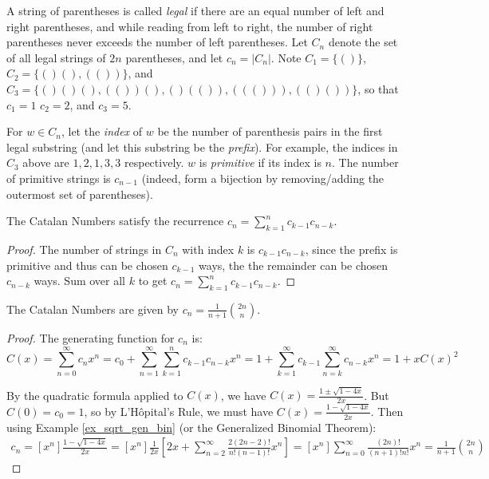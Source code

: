 \documentclass[a4paper]{article}
\begin{document}
\begin{definition}
A string of parentheses is called \emph{legal} if there are an equal number of left and right parentheses, and while reading from left to right, the number of right parentheses never exceeds the number of left parentheses. Let $C_n$ denote the set of all legal strings of $2n$ parentheses, and let $c_n=|C_n|$. Note $C_1=\{()\}$, $C_2=\{()(),(())\}$, and $C_3=\{()()(),(())(),()(()),((())),(()())\}$, so that $c_1=1$ $c_2=2$, and $c_3=5$.

\medskip

For $w\in C_n$, let the \emph{index} of $w$ be the number of parenthesis pairs in the first legal substring (and let this substring be the \emph{prefix}). For example, the indices in $C_3$ above are $1,2,1,3,3$ respectively. $w$ is \emph{primitive} if its index is $n$. The number of primitive strings is $c_{n-1}$ (indeed, form a bijection by removing/adding the outermost set of parentheses).
\end{definition}

\begin{theorem}\label{catalan_recur}
The Catalan Numbers satisfy the recurrence $\displaystyle c_n=\sum_{k=1}^nc_{k-1}c_{n-k}$.

\begin{hl}
\begin{proof}
The number of strings in $C_n$ with index $k$ is $c_{k-1}c_{n-k}$, since the prefix is primitive and thus can be chosen $c_{k-1}$ ways, the the remainder can be chosen $c_{n-k}$ ways. Sum over all $k$ to get $c_n=\sum_{k=1}^nc_{k-1}c_{n-k}$.
\end{proof}
\end{hl}
\end{theorem}

\begin{theorem}
The Catalan Numbers are given by $c_n=\frac1{n+1}\binom{2n}n$.

\begin{hl}
\begin{proof}
The generating function for $c_n$ is:
\begin{equation*}
C(x)
=\sum_{n=0}^\infty c_nx^n
=c_0+\sum_{n=1}^\infty\sum_{k=1}^nc_{k-1}c_{n-k}x^n
=1+\sum_{k=1}^\infty c_{k-1}\sum_{n=k}^\infty c_{n-k}x^n
=1+xC(x)^2
\end{equation*}

By the quadratic formula applied to $C(x)$, we have $C(x)=\frac{1\pm\sqrt{1-4x}}{2x}$. But $C(0)=c_0=1$, so by L'H\^opital's Rule, we must have $C(x)=\frac{1-\sqrt{1-4x}}{2x}$. Then using Example \ref{ex_sqrt_gen_bin} (or the Generalized Binomial Theorem):
\begin{align*}
c_n
=[x^n]\frac{1-\sqrt{1-4x}}{2x}
=[x^n]\frac1{2x}\left[2x+\sum_{n=2}^\infty\frac{2(2n-2)!}{n!(n-1)!}x^n\right]
=[x^n]\sum_{n=0}^\infty\frac{(2n)!}{(n+1)!n!}x^n
=\frac1{n+1}\binom{2n}n
\end{align*}
\end{proof}
\end{hl}
\end{theorem}
\end{document}
